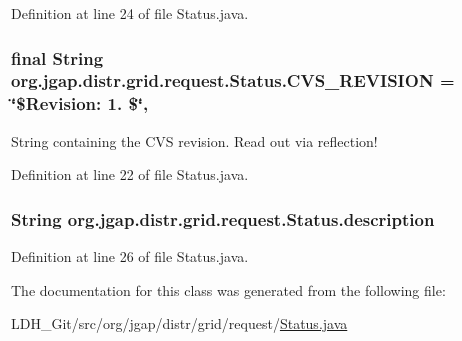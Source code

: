Definition at line 24 of file Status.\-java.

\hypertarget{classorg_1_1jgap_1_1distr_1_1grid_1_1request_1_1_status_a5607ece9d1040f612f4b8323cfda00b0}{
\subsubsection[{C\-V\-S\-\_\-\-R\-E\-V\-I\-S\-I\-O\-N}]{\setlength{\rightskip}{0pt plus 5cm}final String org.\-jgap.\-distr.\-grid.\-request.\-Status.\-C\-V\-S\-\_\-\-R\-E\-V\-I\-S\-I\-O\-N = \char`\"{}\$Revision\-: 1. \$\char`\"{}\hspace{0.3cm}{\ttfamily [static]}, {\ttfamily [private]}}}\label{classorg_1_1jgap_1_1distr_1_1grid_1_1request_1_1_status_a5607ece9d1040f612f4b8323cfda00b0}
String containing the C\-V\-S revision. Read out via reflection! 

Definition at line 22 of file Status.\-java.

\hypertarget{classorg_1_1jgap_1_1distr_1_1grid_1_1request_1_1_status_a8752c218f355df6f52f390c48eefc68c}{
\subsubsection[{description}]{\setlength{\rightskip}{0pt plus 5cm}String org.\-jgap.\-distr.\-grid.\-request.\-Status.\-description}}\label{classorg_1_1jgap_1_1distr_1_1grid_1_1request_1_1_status_a8752c218f355df6f52f390c48eefc68c}


Definition at line 26 of file Status.\-java.



The documentation for this class was generated from the following file\-:\begin{DoxyCompactItemize}
\item 
L\-D\-H\-\_\-\-Git/src/org/jgap/distr/grid/request/\hyperlink{_status_8java}{Status.\-java}\end{DoxyCompactItemize}

